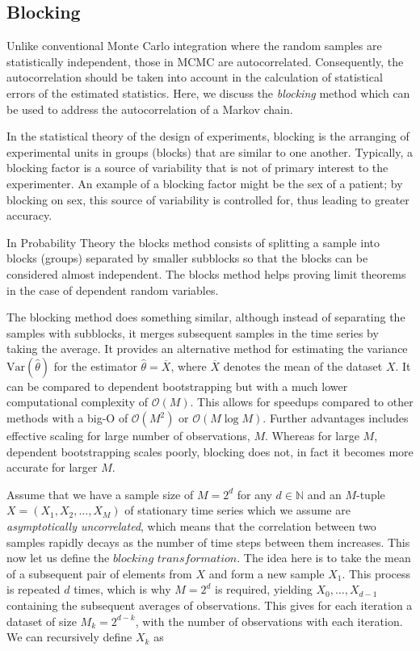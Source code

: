 \subsection{Blocking}\label{sec:blocking}

Unlike conventional Monte Carlo integration where the random samples are statistically independent, those in MCMC are autocorrelated. Consequently, the autocorrelation should be taken into account in the calculation of statistical errors of the estimated statistics. Here, we discuss the \textit{blocking} method \citep{doi:10.1063/1.457480} which can be used to address the autocorrelation of a Markov chain.   

In the statistical theory of the design of experiments, blocking is the arranging of experimental units in groups (blocks) that are similar to one another. Typically, a blocking factor is a source of variability that is not of primary interest to the experimenter. An example of a blocking factor might be the sex of a patient; by blocking on sex, this source of variability is controlled for, thus leading to greater accuracy.

In Probability Theory the blocks method consists of splitting a sample into blocks (groups) separated by smaller subblocks so that the blocks can be considered almost independent. The blocks method helps proving limit theorems in the case of dependent random variables. 

The blocking method does something similar, although instead of separating the samples with subblocks, it merges subsequent samples in the time series by taking the average. It provides an alternative method for estimating the variance $\text{Var}(\hat{\theta})$ for the estimator $\hat{\theta} = \overline{X}$, where $\overline{X}$ denotes the mean of the dataset $X$. It can be compared to dependent bootstrapping but with a much lower computational complexity of $\mathcal{O}(M)$. This allows for speedups compared to other methods with a big-O of $\mathcal{O}(M^2)$ or $\mathcal{O}(M \log M)$. Further advantages includes effective scaling for large number of observations,  $M$. Whereas for large $M$, dependent bootstrapping scales poorly, blocking does not, in fact it becomes more accurate for larger $M$.  

Assume that we have a sample size of $M = 2^d$ for any $d \in \mathbb{N}$ and an $M$-tuple $X = (X_1, X_2, \dots, X_M)$ of stationary time series which we assume are \textit{asymptotically uncorrelated}, which means that the correlation between two samples rapidly decays as the number of time steps between them increases. This now let us define the $\textit{blocking transformation}$. The idea here is to take the mean of a subsequent pair of elements from $X$ and form a new sample $X_1$. This process is repeated $d$ times, which is why $M=2^d$ is required, yielding $X_0, \dots, X_{d-1}$ containing the subsequent averages of observations. This gives for each iteration a dataset of size $M_k = 2^{d-k}$, with the number of observations with each iteration. We can recursively define $X_k$ as


